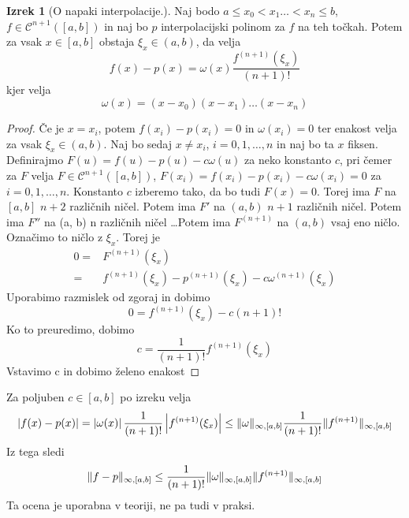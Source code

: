 \documentclass[a4paper,12pt]{article}
\DeclarePairedDelimiter\norm{\lVert}{\rVert}
\theoremstyle{definition}
\newtheorem{theorem}[counter]{Izrek}
\theoremstyle{remark}
\begin{document}
\begin{theorem}[O napaki interpolacije.]
    Naj bodo $a \leq x_0 < x_1 \dots < x_n \leq b$, $f \in \mathscr{C}^{n+1}([a, b])$ in naj bo $p$ interpolacijski polinom za $f$ na teh točkah. Potem za vsak $x \in [a, b]$
    obstaja $\xi_x \in (a, b)$, da velja
    \begin{equation*}
        f(x) - p(x) = \omega (x) \frac{f^{(n+1)}(\xi_x)}{(n+1)!}
    \end{equation*}
    kjer velja
    \begin{equation*}
        \omega (x) = (x - x_0)(x-x_1) \dots (x - x_n)
    \end{equation*}
\end{theorem}

\begin{proof}
    Če je $x = x_i$, potem $f(x_i) - p(x_i) = 0$ in $\omega (x_i) = 0$ ter enakost velja za vsak $\xi_x \in (a, b)$. Naj bo sedaj $x \neq x_i$, $i = 0, 1, \dots, n$
    in naj bo ta $x$ fiksen.
    Definirajmo $F(u) = f(u) - p(u) - c \omega (u)$ za neko konstanto $c$, pri čemer za $F$ velja $F \in \mathscr{C}^{n+1}([a, b])$, $F(x_i) = f(x_i) - p(x_i) - c \omega (x_i) = 0$ za $i = 0, 1, \dots, n$.
    Konstanto $c$ izberemo tako, da bo tudi $F(x) = 0$. Torej ima $F$ na $[a, b]$ $n+2$ različnih ničel. Potem ima $F'$ na $(a, b)$ $n+1$ različnih ničel.
    Potem ima $F''$ na (a, b) n različnih ničel \dots Potem ima $F^{(n+1)}$ na $(a, b)$ vsaj eno ničlo. Označimo to ničlo z $\xi_x$. Torej je
    \begin{align*}
        0 =& F^{(n+1)}(\xi_x) \\
          =& f^{(n+1)}(\xi_x) - p^{(n+1)}(\xi_x) - c \omega ^{(n+1)}(\xi_x)
    \end{align*}
    Uporabimo razmislek od zgoraj in dobimo
    \begin{equation*}
        0 = f^{(n+1)}(\xi_x) - c (n+1)!
    \end{equation*}
    Ko to preuredimo, dobimo
    \begin{equation*}
        c = \frac{1}{(n+1)!}f^{(n+1)}(\xi_x)
    \end{equation*}
    Vstavimo c in dobimo želeno enakost
\end{proof}

Za poljuben $c \in [a, b]$ po izreku velja
\begin{equation*}
    \left| f(x) - p(x) \right| = \left| \omega(x) \right| \frac{1}{(n+1)!} \left| f^{(n+1)}(\xi_x) \right| \leq \norm{\omega}_{\infty, [a, b]} \frac{1}{(n+1)!} \norm{f^{(n+1)}}_{\infty, [a, b]}
\end{equation*}
Iz tega sledi
\begin{equation*}
    \norm{f - p}_{\infty, [a, b]} \leq \frac{1}{(n+1)!} \norm{\omega}_{\infty, [a, b]} \norm{f^{(n+1)}}_{\infty, [a, b]}
\end{equation*}
Ta ocena je uporabna v teoriji, ne pa tudi v praksi.
\end{document}
